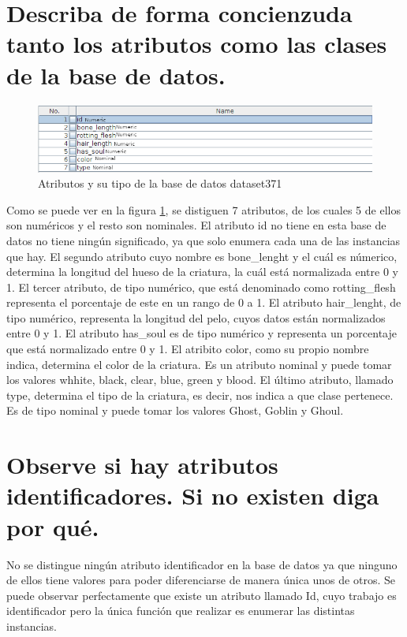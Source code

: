 \documentclass[11pt,twoside,a4paper]{book}
\begin{document}
\section{Describa de forma concienzuda tanto los atributos como las clases de la base de datos.}
\begin{figure}[H]
   \includegraphics[width=\textwidth]{ejercicio4_4.png}
	\caption{Atributos y su tipo de la base de datos dataset371}
	\label{Fig9}
\end{figure}
Como se puede ver en la figura \ref{Fig9}, se distiguen 7 atributos, de los cuales
5 de ellos son numéricos y el resto son nominales. El atributo id no tiene en esta
base de datos no tiene ningún significado, ya que solo enumera cada una de las instancias
que hay. El segundo atributo cuyo nombre es bone\_lenght y el cuál es númerico,
determina la longitud del hueso de la criatura, la cuál está normalizada entre 0
y 1. El tercer atributo, de tipo numérico, que está denominado como rotting\_flesh
representa el porcentaje de este en un rango de 0 a 1.
El atributo hair\_lenght, de tipo numérico, representa la longitud del pelo, cuyos
datos están normalizados entre 0 y 1.
El atributo has\_soul es de tipo numérico y representa un porcentaje que está normalizado
entre 0 y 1. El atribito color, como su propio nombre indica, determina el color
de la criatura. Es un atributo nominal y puede tomar los valores whhite, black, clear,
blue, green y blood.
El último atributo, llamado type, determina el tipo de la criatura, es decir, nos indica
a que clase pertenece. Es de tipo nominal y puede tomar los valores Ghost, Goblin y Ghoul.

\section{Observe si hay atributos identificadores. Si no existen diga por qué.}
No se distingue ningún atributo identificador en la base de datos ya que ninguno
de ellos tiene valores para poder diferenciarse de manera única unos de otros. Se puede
observar perfectamente que existe un atributo llamado Id, cuyo trabajo es identificador
pero la única función que realizar es enumerar las distintas instancias.
\end{document}
